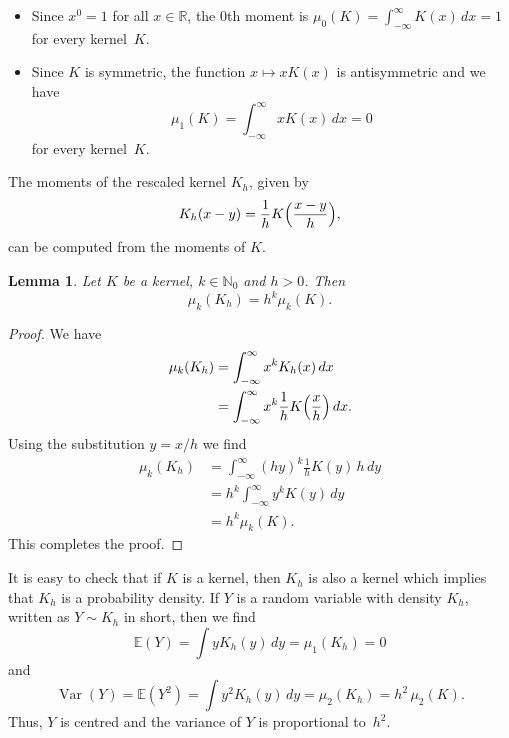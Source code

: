 \documentclass[
  a4paper,
]{article}
\newtheorem{lemma}{Lemma}[section]
\theoremstyle{definition}
\theoremstyle{definition}
\theoremstyle{definition}
\theoremstyle{definition}
\theoremstyle{remark}
\begin{document}
\begin{itemize}
\item
  Since \(x^0 = 1\) for all \(x\in\mathbb{R}\),
  the \(0\)th moment is \(\mu_0(K) = \int_{-\infty}^\infty K(x) \,dx = 1\)
  for every kernel~\(K\).
\item
  Since \(K\) is symmetric, the function \(x \mapsto x K(x)\) is
  antisymmetric and we have
  \begin{equation*}
    \mu_1(K)
    = \int_{-\infty}^\infty x K(x) \,dx
    = 0
  \end{equation*}
  for every kernel~\(K\).
\end{itemize}

The moments of the rescaled kernel \(K_h\), given by
\begin{equation*}
    K_h(x - y)
    = \frac{1}{h} K\Bigl( \frac{x-y}{h} \Bigr),
\end{equation*}
can be computed from the moments of \(K\).

\begin{lemma}
\protect\hypertarget{lem:Kh-scal}{}\label{lem:Kh-scal}Let \(K\) be a kernel, \(k \in \mathbb{N}_0\) and \(h > 0\). Then
\begin{equation*}
  \mu_k(K_h)
  = h^k \mu_k(K).
\end{equation*}
\end{lemma}

\begin{proof}
We have
\begin{align*}
  \mu_k(K_h)
  &= \int_{-\infty}^\infty x^k K_h(x) \,dx \\
  &= \int_{-\infty}^\infty x^k \frac1h K\Bigl(\frac{x}{h}\Bigr) \,dx.
\end{align*}
Using the substitution \(y = x/h\) we find
\begin{align*}
  \mu_k(K_h)
  &= \int_{-\infty}^\infty (hy)^k \frac1h K(y) \, h \,dy \\
  &= h^k \int_{-\infty}^\infty y^k K(y) \,dy \\
  &= h^k \mu_k(K).
\end{align*}
This completes the proof.
\end{proof}

It is easy to check that if \(K\) is a kernel, then \(K_h\) is also a kernel which
implies that \(K_h\) is a probability density. If \(Y\) is a random variable with
density \(K_h\), written as \(Y \sim K_h\) in short, then we find
\begin{equation*}
  \mathbb{E}(Y)
  = \int y K_h(y) \,dy
  = \mu_1(K_h)
  = 0
\end{equation*}
and
\begin{equation}
  \mathop{\mathrm{Var}}(Y)
  = \mathbb{E}(Y^2)
  = \int y^2 K_h(y) \,dy
  = \mu_2(K_h)
  = h^2 \, \mu_2(K).  \label{eq:Kh-var-Y}
\end{equation}
Thus, \(Y\) is centred and the variance of \(Y\) is proportional to~\(h^2\).
\end{document}
